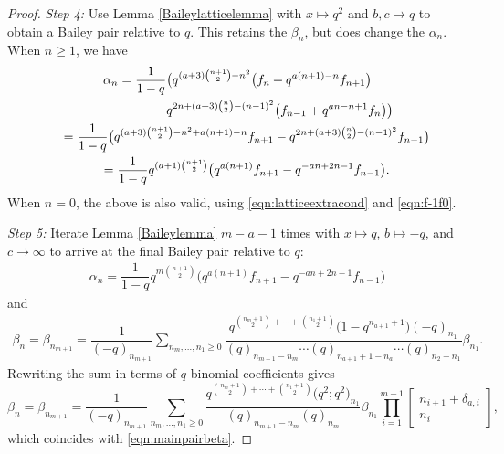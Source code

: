 \begin{proof}
	
	{\it Step 4\emph{:}} Use Lemma \ref{Baileylatticelemma} with $x \mapsto q^2$ and $b,c \mapsto q$ to obtain a Bailey pair relative to $q$. This retains the $\beta_n$, but does change the $\alpha_n$. When $n \geq 1$, we have
	\begin{gather*}
		\alpha_n = \dfrac{1}{1-q}
		\bigl(
		q^{(a+3)\binom{n+1}{2}-n^2}\bigl(f_n+q^{a(n+1)-n}f_{n+1}\bigr) \\ \hphantom{\alpha_n = \dfrac{1}{1-q}\bigl(}{}
		- q^{2n+(a+3)\binom{n}{2}-(n-1)^2}\bigl(f_{n-1}+q^{an-n+1}f_{n}\bigr)
		\bigr)\\ \hphantom{\alpha_n}{}
		=
		\dfrac{1}{1-q}
		\bigl(
		q^{(a+3)\binom{n+1}{2}-n^2+a(n+1)-n}f_{n+1}
		-
		q^{2n+(a+3)\binom{n}{2}-(n-1)^2}f_{n-1}
		\bigr)\\ \hphantom{\alpha_n}{}
		= \dfrac{1}{1-q}q^{(a+1)\binom{n+1}{2}}\bigl(
		q^{a(n+1)}f_{n+1} -q^{-an+2n-1}f_{n-1}
		\bigr).
	\end{gather*}
	When $n=0$, the above is also valid, using \eqref{eqn:latticeextracond} and \eqref{eqn:f-1f0}.
	
	
	{\it Step 5\emph{:}} Iterate Lemma \ref{Baileylemma} $m-a-1$ times with $x\mapsto q$, $b\mapsto -q$, and $c\rightarrow \infty$ to arrive at the final Bailey pair relative to $q$:
	\begin{align*}
		\alpha_n
		=
		\dfrac{1}{1-q}q^{m\binom{n+1}{2}}\bigl(
		q^{a(n+1)}f_{n+1} -q^{-an+2n-1}f_{n-1}
		\bigr)
	\end{align*}
	and
	\begin{align*}
		\beta_n=\beta_{n_{m+1}}=
		\dfrac{1}{(-q)_{n_{m+1}}}\sum_{n_m,\dots,n_1\geq 0}
		\dfrac{q^{\binom{n_{m}+1}{2}+\cdots+\binom{n_1+1}{2}}\bigl(1-q^{n_{a+1}+1}\bigr)(-q)_{n_1}}
		{(q)_{n_{m+1}-n_{m}}\cdots
			(q)_{n_{a+1}+1-n_a}\cdots (q)_{n_2-n_1}}\beta_{n_1}.
	\end{align*}
	Rewriting the sum in terms of $q$-binomial coefficients gives{\samepage
	\begin{equation*} %
		\beta_n = \beta_{n_{m+1}} = \frac{1}{(-q)_{n_{m+1}}} \sum_{n_m, \dots, n_1 \geq 0} \frac{q^{\binom{n_m+1}{2} + \cdots + \binom{n_1+1}{2}}\bigl(q^2;q^2\bigr)_{n_1}}{(q)_{n_{m+1}-n_m} (q)_{n_m}} \beta_{n_1} \prod_{i=1}^{m-1} \begin{bmatrix} n_{i+1} + \delta_{a,i} \\ n_i \end{bmatrix},
	\end{equation*}
	which coincides with \eqref{eqn:mainpairbeta}.}
	

\end{proof}
